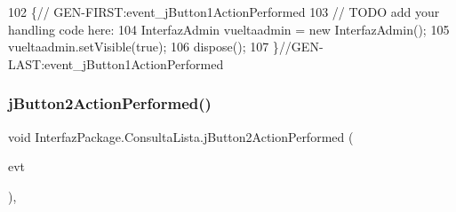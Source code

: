 \begin{DoxyCode}
102                                                                          \{\textcolor{comment}{//
      GEN-FIRST:event\_jButton1ActionPerformed}
103         \textcolor{comment}{// TODO add your handling code here:}
104         InterfazAdmin vueltaadmin = \textcolor{keyword}{new} InterfazAdmin();
105         vueltaadmin.setVisible(\textcolor{keyword}{true});
106         dispose();
107     \}\textcolor{comment}{//GEN-LAST:event\_jButton1ActionPerformed}
\end{DoxyCode}
\mbox{\label{class_interfaz_package_1_1_consulta_lista_af864b1171ca3a578174fd3dd0904f212}} 
\subsubsection{\texorpdfstring{j\+Button2\+Action\+Performed()}{jButton2ActionPerformed()}}
{\footnotesize\ttfamily void Interfaz\+Package.\+Consulta\+Lista.\+j\+Button2\+Action\+Performed (\begin{DoxyParamCaption}\item[{java.\+awt.\+event.\+Action\+Event}]{evt }\end{DoxyParamCaption})\hspace{0.3cm}{\ttfamily [inline]}, {\ttfamily [private]}}


